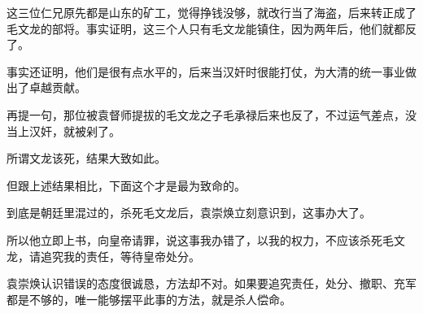 \begin{multicols}{\theparacolNo}
		这三位仁兄原先都是山东的矿工，觉得挣钱没够，就改行当了海盗，后来转正成了毛文龙的部将。事实证明，这三个人只有毛文龙能镇住，因为两年后，他们就都反了。

		事实还证明，他们是很有点水平的，后来当汉奸时很能打仗，为大清的统一事业做出了卓越贡献。

		再提一句，那位被袁督师提拔的毛文龙之子毛承禄后来也反了，不过运气差点，没当上汉奸，就被剁了。

		所谓文龙该死，结果大致如此。

		但跟上述结果相比，下面这个才是最为致命的。

		到底是朝廷里混过的，杀死毛文龙后，袁崇焕立刻意识到，这事办大了。

		所以他立即上书，向皇帝请罪，说这事我办错了，以我的权力，不应该杀死毛文龙，请追究我的责任，等待皇帝处分。

		袁崇焕认识错误的态度很诚恳，方法却不对。如果要追究责任，处分、撤职、充军都是不够的，唯一能够摆平此事的方法，就是杀人偿命。
		\ifnum{}
	\end{multicols}
\fi
\newpage
